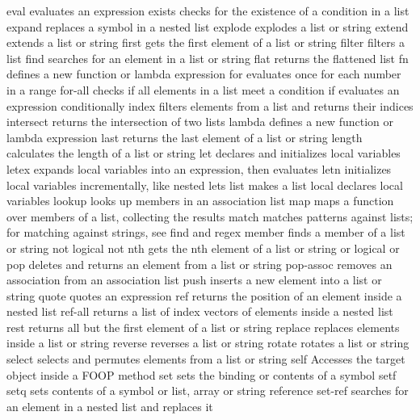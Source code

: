 \documentclass[cn,11pt]{elegantbook}
\begin{document}
\begin{itemize}
eval              evaluates an expression
exists            checks for the existence of a condition in a list
expand            replaces a symbol in a nested list
explode           explodes a list or string
extend            extends a list or string
first             gets the first element of a list or string
filter            filters a list
find              searches for an element in a list or string
flat              returns the flattened list
fn                defines a new function or lambda expression
for               evaluates once for each number in a range
for-all           checks if all elements in a list meet a condition
if                evaluates an expression conditionally
index             filters elements from a list and returns their indices
intersect         returns the intersection of two lists
lambda            defines a new function or lambda expression
last              returns the last element of a list or string
length            calculates the length of a list or string
let               declares and initializes local variables
letex             expands local variables into an expression, then evaluates
letn              initializes local variables incrementally, like nested lets
list              makes a list
local             declares local variables
lookup            looks up members in an association list
map               maps a function over members of a list, collecting the results
match             matches patterns against lists; for matching against strings, see find and regex
member            finds a member of a list or string
not               logical not
nth               gets the nth element of a list or string
or                logical or
pop               deletes and returns an element from a list or string
pop-assoc         removes an association from an association list
push              inserts a new element into a list or string
quote             quotes an expression
ref               returns the position of an element inside a nested list
ref-all           returns a list of index vectors of elements inside a nested list
rest              returns all but the first element of a list or string
replace           replaces elements inside a list or string
reverse           reverses a list or string
rotate            rotates a list or string
select            selects and permutes elements from a list or string
self              Accesses the target object inside a FOOP method
set               sets the binding or contents of a symbol
setf setq         sets contents of a symbol or list, array or string reference
set-ref           searches for an element in a nested list and replaces it

\end{itemize}
\end{document}
